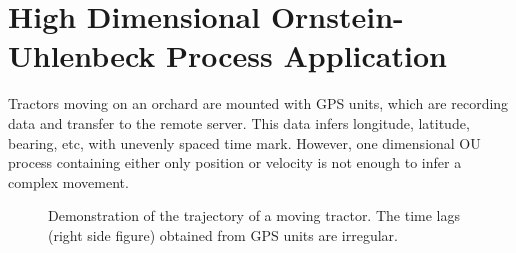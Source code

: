 \section{High Dimensional Ornstein-Uhlenbeck Process Application}\label{SectionHighDimensionalOU}

Tractors moving on an orchard are mounted with GPS units, which are recording data and transfer to the remote server. This data infers longitude, latitude, bearing, etc, with unevenly spaced time mark. However, one dimensional OU process containing either only position or velocity is not enough to infer a complex movement. 

\begin{figure}[h]
\centering
{}
\caption{Demonstration of the trajectory of a moving tractor. The time lags (right side figure) obtained from GPS units are irregular.}
\label{realdatareview}
\end{figure}

